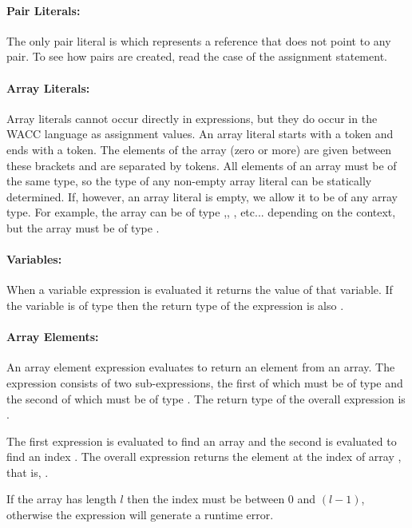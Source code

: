 \documentclass[a4paper]{article}
\theoremstyle{definition}
\begin{document}
\paragraph{Pair Literals:}
The only pair literal  is  which represents a reference that does not point to any pair. 
To see how pairs are created, read the  case of the assignment statement.

\paragraph{Array Literals:} Array literals cannot occur directly in expressions, but they do occur in the WACC language as assignment values.
An array literal starts with a \lit{[} token and ends with a \lit{]} token. 
The elements of the array (zero or more) are given between these brackets and are separated by \lit{,} tokens. 
All elements of an array must be of the same type, so the type of any non-empty array literal can be statically determined.
If, however, an array literal is empty, we allow it to be of any array type.
For example, the array \lit{[]} can be of type ,, , etc... depending on the context, but the array \lit{[1]} must be of type .

\paragraph{Variables:}
When a variable expression  is evaluated it returns the value of that variable. 
If the variable is of type  then the return type of the expression is also .

\paragraph{Array Elements:}
An array element expression evaluates to return an element from an array.
The expression consists of two sub-expressions, the first of which must be of type  and the second of which must be of type .
The return type of the overall expression is .

The first expression is evaluated to find an array  and the second is evaluated to find an index .
The overall expression returns the element at the index  of array , that is, .

If the array has length $l$ then the index  must be between $0$ and $(l - 1)$, 
otherwise the expression will generate a runtime error. 
\end{document}
